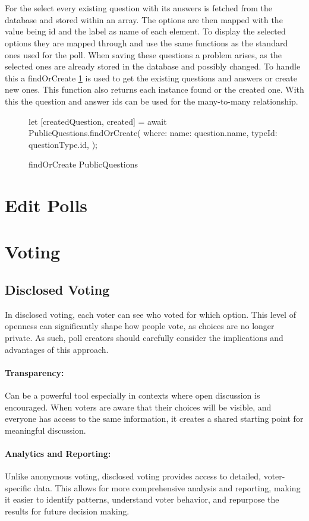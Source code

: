 \documentclass[a4paper,12pt]{report}
\begin{document}
\\ \\
For the select every existing question with its answers is fetched from the database and stored within an array. The options are then mapped with the value being id and the label as name of each element. To display the selected options they are mapped through and use the same functions as the standard ones used for the poll. When saving these questions a problem arises, as the selected ones are already stored in the database and possibly changed. To handle this a findOrCreate \ref{fig:publicQuestions} is used to get the existing questions and answers or create new ones. This function also returns each instance found or the created one. With this the question and answer ids can be used for the many-to-many relationship. \parencite{sequelizedoku} 
\begin{figure}[h!]
\begin{code}
let [createdQuestion, created] = await PublicQuestions.findOrCreate({
	where: {
		name: question.name,
		typeId: questionType.id,
	}
});
\end{code}
	\caption{findOrCreate PublicQuestions}
	\label{fig:publicQuestions}
\end{figure}

\section{Edit Polls}

\section{Voting}
\subsection{Disclosed Voting}
In disclosed voting, each voter can see who voted for which option. This level of openness can significantly shape how people vote, as choices are no longer private. As such, poll creators should carefully consider the implications and advantages of this approach.
\paragraph{Transparency:}
Can be a powerful tool especially in contexts where open discussion is encouraged. When voters are aware that their choices will be visible, and everyone has access to the same information, it creates a shared starting point for meaningful discussion.
\paragraph{Analytics and Reporting:}
Unlike anonymous voting, disclosed voting provides access to detailed, voter-specific data. This allows for more comprehensive analysis and reporting, making it easier to identify patterns, understand voter behavior, and repurpose the results for future decision making.
\end{document}
